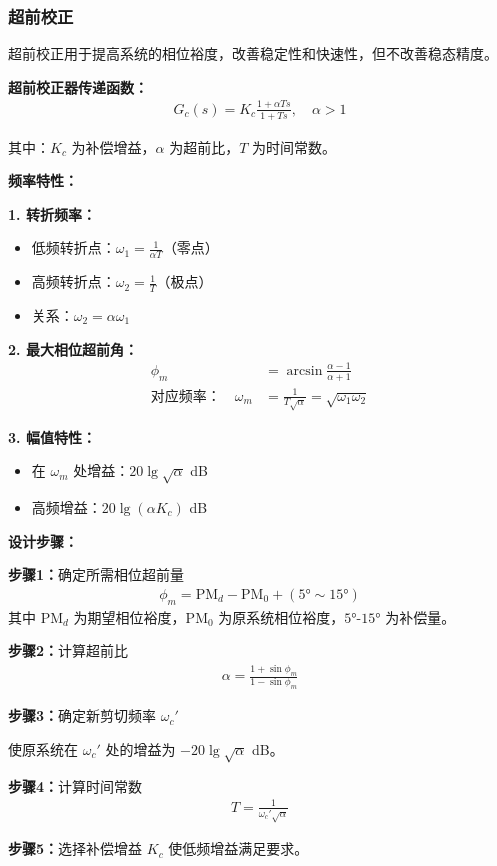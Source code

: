 \subsubsection{超前校正}

超前校正用于提高系统的相位裕度，改善稳定性和快速性，但不改善稳态精度。

\textbf{超前校正器传递函数：}
\begin{align*}
G_c(s) = K_c \frac{1 + \alpha T s}{1 + T s}, \quad \alpha > 1
\end{align*}

其中：$K_c$ 为补偿增益，$\alpha$ 为超前比，$T$ 为时间常数。

\begin{minipage}[t]{0.52\textwidth}
\textbf{频率特性：}

\textbf{1. 转折频率：}
\begin{itemize}
    \item 低频转折点：$\omega_1 = \frac{1}{\alpha T}$（零点）
    \item 高频转折点：$\omega_2 = \frac{1}{T}$（极点）
    \item 关系：$\omega_2 = \alpha \omega_1$
\end{itemize}

\textbf{2. 最大相位超前角：}
\begin{align*}
\phi_m &= \arcsin\frac{\alpha - 1}{\alpha + 1} \\
\text{对应频率：} \quad \omega_m &= \frac{1}{T\sqrt{\alpha}} = \sqrt{\omega_1 \omega_2}
\end{align*}

\textbf{3. 幅值特性：}
\begin{itemize}
    \item 在 $\omega_m$ 处增益：$20\lg\sqrt{\alpha}$ dB
    \item 高频增益：$20\lg(\alpha K_c)$ dB
\end{itemize}

\vspace{0.3cm}
\textbf{设计步骤：}

\textbf{步骤1：}确定所需相位超前量
\begin{align*}
\phi_m = \text{PM}_d - \text{PM}_0 + (5° \sim 15°)
\end{align*}
其中 PM$_d$ 为期望相位裕度，PM$_0$ 为原系统相位裕度，$5°$-$15°$ 为补偿量。

\textbf{步骤2：}计算超前比
\begin{align*}
\alpha = \frac{1 + \sin\phi_m}{1 - \sin\phi_m}
\end{align*}

\textbf{步骤3：}确定新剪切频率 $\omega_c'$

使原系统在 $\omega_c'$ 处的增益为 $-20\lg\sqrt{\alpha}$ dB。

\textbf{步骤4：}计算时间常数
\begin{align*}
T = \frac{1}{\omega_c' \sqrt{\alpha}}
\end{align*}

\textbf{步骤5：}选择补偿增益 $K_c$ 使低频增益满足要求。

\end{minipage}\hfill
